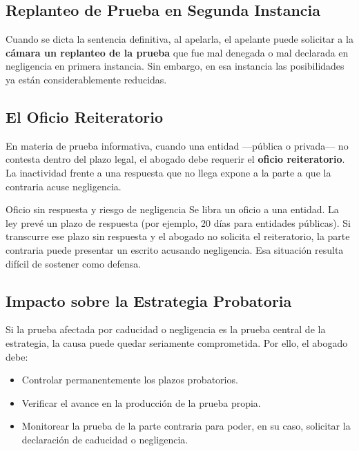 \documentclass[12pt,oneside]{book}
\begin{document}
\subsection{Replanteo de Prueba en Segunda Instancia}

Cuando se dicta la sentencia definitiva, al apelarla, el apelante puede solicitar a la \textbf{cámara un replanteo de la prueba} que fue mal denegada o mal declarada en negligencia en primera instancia. Sin embargo, en esa instancia las posibilidades ya están considerablemente reducidas.

\subsection{El Oficio Reiteratorio}

En materia de prueba informativa, cuando una entidad —pública o privada— no contesta dentro del plazo legal, el abogado debe requerir el \textbf{oficio reiteratorio}. La inactividad frente a una respuesta que no llega expone a la parte a que la contraria acuse negligencia.

\begin{example}{Oficio sin respuesta y riesgo de negligencia}
Se libra un oficio a una entidad. La ley prevé un plazo de respuesta (por ejemplo, 20 días para entidades públicas). Si transcurre ese plazo sin respuesta y el abogado no solicita el reiteratorio, la parte contraria puede presentar un escrito acusando negligencia. Esa situación resulta difícil de sostener como defensa.
\end{example}

\subsection{Impacto sobre la Estrategia Probatoria}

Si la prueba afectada por caducidad o negligencia es la prueba central de la estrategia, la causa puede quedar seriamente comprometida. Por ello, el abogado debe:

\begin{itemize}
    \item Controlar permanentemente los plazos probatorios.
    \item Verificar el avance en la producción de la prueba propia.
    \item Monitorear la prueba de la parte contraria para poder, en su caso, solicitar la declaración de caducidad o negligencia.
\end{itemize}
\end{document}
